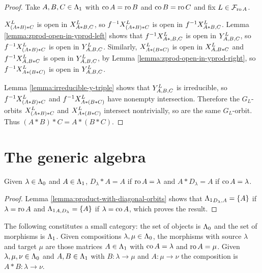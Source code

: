 \documentclass[a4paper, 11pt]{report}
\begin{document}
\begin{proof}
Take $A,B,C\in\matrices$ with $\co{A}=\ro{B}$ and $\co{B}=\ro{C}$ and fix $L\in\flags_{\ro{A}}$.

$\xprod[L]{(A\ast B)\ast C}$ is open in $\xprod[L]{A\ast B,C}$, so $f^{-1}\xprod[L]{(A\ast B)\ast C}$ is open in $f^{-1}\xprod[L]{A\ast B,C}$. Lemma \ref{lemma:zprod-open-in-yprod-left} shows that $f^{-1}\xprod[L]{A\ast,B,C}$ is open in $\yprod[L]{A,B,C}$, so $f^{-1}\xprod[L]{(A\ast B)\ast C}$ is open in $\yprod[L]{A,B,C}$. Similarly, $\xprod[L]{A\ast(B\ast C)}$ is open in $\xprod[L]{A,B\ast C}$ and $f^{-1}\xprod[L]{A,B\ast C}$ is open in $\yprod[L]{A,B,C}$, by Lemma \ref{lemma:zprod-open-in-yprod-right}, so $f^{-1}\xprod[L]{A\ast(B\ast C)}$ is open in $\yprod[L]{A,B,C}$.

Lemma \ref{lemma:irreducible-y-triple} shows that $\yprod[L]{A,B,C}$ is irreducible, so $f^{-1}\xprod[L]{(A\ast B)\ast C}$ and $f^{-1}\xprod[L]{A\ast(B\ast C)}$ have nonempty intersection. Therefore the $G_L$-orbits $\xprod[L]{(A\ast B)\ast C}$ and $\xprod[L]{A\ast(B\ast C)}$ intersect nontrivially, so are the same $G_L$-orbit. Thus $(A\ast B)\ast C= A\ast(B\ast C)$. 
\end{proof}


\section{The generic algebra}

\begin{lemma}\label{lemma:identity-morphisms}
Given $\lambda\in\compositions$ and $A\in\matrices$, $D_\lambda\ast A = A$ if $\ro{A}=\lambda$ and $A\ast D_\lambda = A$ if $\co{A}=\lambda$.
\end{lemma}
\begin{proof}
Lemma \ref{lemma:product-with-diagonal-orbits} shows that $\matrices_{D_\lambda,A} = \{A\}$ if $\lambda=\ro{A}$ and $\matrices_{A,D_\lambda} = \{A\}$ if $\lambda=\co{A}$, which proves the result. 
\end{proof}

\begin{theorem}\label{thm:generic-category}
The following constitutes a small category: the set of objects is $\compositions$ and the set of morphisms is $\matrices$. Given compositions $\lambda,\mu\in\compositions$, the morphisms with source $\lambda$ and target $\mu$ are those matrices $A\in\matrices$ with $\co{A}=\lambda$ and $\ro{A}=\mu$. Given $\lambda,\mu,\nu\in\compositions$ and $A,B\in\matrices$ with $B\colon\lambda\to\mu$ and $A\colon\mu\to\nu$ the composition is $A\ast B\colon\lambda\to\nu$.
\end{theorem}
\end{document}
